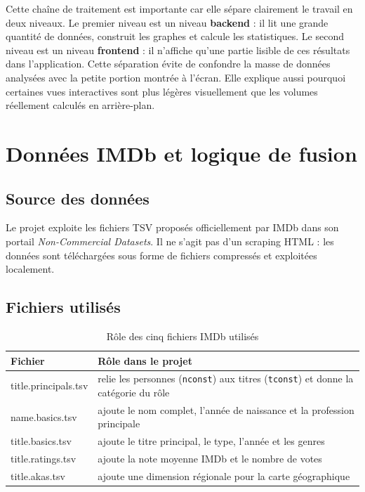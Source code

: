\documentclass[a4paper,12pt]{article}
\newcommand{\code}[1]{\texttt{\small\color{imdbslate}#1}}
\begin{document}
Cette chaîne de traitement est importante car elle sépare clairement le travail en deux niveaux. Le premier niveau est un niveau \textbf{backend} : il lit une grande quantité de données, construit les graphes et calcule les statistiques. Le second niveau est un niveau \textbf{frontend} : il n'affiche qu'une partie lisible de ces résultats dans l'application. Cette séparation évite de confondre la masse de données analysées avec la petite portion montrée à l'écran. Elle explique aussi pourquoi certaines vues interactives sont plus légères visuellement que les volumes réellement calculés en arrière-plan.

\section{Données IMDb et logique de fusion}

\subsection{Source des données}

Le projet exploite les fichiers TSV proposés officiellement par IMDb dans son portail \textit{Non-Commercial Datasets}. Il ne s'agit pas d'un scraping HTML : les données sont téléchargées sous forme de fichiers compressés et exploitées localement.

\subsection{Fichiers utilisés}

\begin{table}[H]
\centering
\small
\begin{tabularx}{\linewidth}{>{\ttfamily\color{imdbblue}\small}l X}
\toprule
\rowcolor{imdblight}
Fichier & Rôle dans le projet \\
\midrule
title.principals.tsv & relie les personnes (\code{nconst}) aux titres (\code{tconst}) et donne la catégorie du rôle \\
name.basics.tsv & ajoute le nom complet, l'année de naissance et la profession principale \\
title.basics.tsv & ajoute le titre principal, le type, l'année et les genres \\
title.ratings.tsv & ajoute la note moyenne IMDb et le nombre de votes \\
title.akas.tsv & ajoute une dimension régionale pour la carte géographique \\
\bottomrule
\end{tabularx}
\caption{Rôle des cinq fichiers IMDb utilisés}
\end{table}
\end{document}
